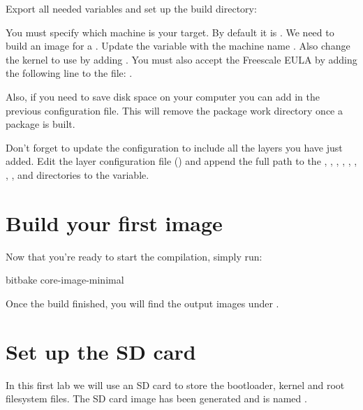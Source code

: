 Export all needed variables and set up the build directory:

You must specify which machine is your target. By default it
is . We need to build an image for a .
Update the  variable with the machine name . Also change the kernel to use by adding . You must also accept the Freescale EULA by adding the following line to the  file: .
  
Also, if you need to save disk space on your computer you can add  in the previous configuration file. This will remove the
package work directory once a package is built.

Don't forget to update the configuration to include all the layers you have just added. Edit the
layer configuration file () and append the
full path to the ,
, , ,
, ,
, , and
 directories to the  variable.

\section{Build your first image}

Now that you're ready to start the compilation, simply run:
\begin{bashinput}
bitbake core-image-minimal
\end{bashinput}

Once the build finished, you will find the output images under
.

\section{Set up the SD card}

In this first lab we will use an SD card to store the bootloader, kernel and
root filesystem files. The SD card image has been generated and is
named .

